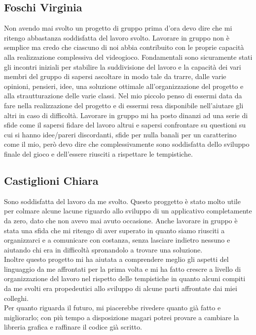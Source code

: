 \documentclass[a4paper,12pt]{report}
\begin{document}
\subsection{Foschi Virginia}
Non avendo mai svolto un progetto di gruppo prima d'ora devo dire che mi ritengo abbastanza soddisfatta del lavoro svolto. Lavorare in gruppo non è semplice ma credo che ciascuno di noi abbia contribuito con le proprie capacità alla realizzazione complessiva del videogioco.
Fondamentali sono sicuramente stati gli incontri iniziali per stabilire la suddivisione del lavoro e la capacità dei vari membri del gruppo di sapersi ascoltare in modo tale da trarre, dalle varie opinioni, pensieri, idee, una soluzione ottimale all'organizzazione del progetto e alla strautturazione delle varie classi.
Nel mio piccolo penso di essermi data da fare nella realizzazione del progetto e di essermi resa disponibile nell'aiutare gli altri in caso di difficoltà.
Lavorare in gruppo mi ha posto dinanzi ad una serie di sfide come il sapersi fidare del lavoro altrui e sapersi confrontare su questioni su cui si hanno idee/pareri discordanti, sfide per nulla banali per un caratterino come il mio, però devo dire che complessivamente sono soddisfatta dello sviluppo finale del gioco e dell'essere riusciti a rispettare le tempistiche.
\subsection{Castiglioni Chiara}
Sono soddisfatta del lavoro da me svolto. Questo proggetto è stato molto utile per colmare alcune lacune riguardo allo sviluppo di un applicativo completamente da zero,
dato che non avevo mai avuto occasione. Anche lavorare in gruppo è stata una sfida che mi ritengo di aver superato in quanto siamo riusciti a organizzarci e a comunicare con
costanza, senza lasciare indietro nessuno e aiutando chi era in difficoltà spronandolo a trovare una soluzione.\\
Inoltre questo progetto mi ha aiutata a comprendere meglio gli aspetti del linguaggio da me affrontati per la prima volta e mi ha fatto crescre a livello di organizzazione del lavoro nel rispetto delle
tempistiche in quanto alcuni compiti da me svolti era propedeutici allo sviluppo di alcune parti affrontate dai miei colleghi.
\\Per quanto riguarda il futuro, mi piacerebbe rivedere quanto già fatto e migliorarlo; con più tempo a disposizione magari potrei provare a cambiare la libreria grafica e raffinare il codice già scritto.
\end{document}
